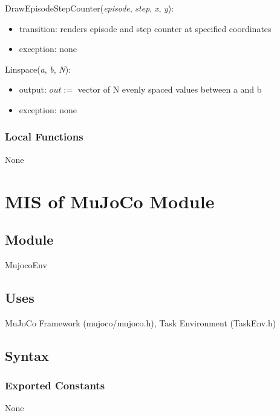 \documentclass[12pt, titlepage]{article}
\begin{document}
\noindent DrawEpisodeStepCounter(\textit{episode}, \textit{step}, \textit{x}, \textit{y}):
\begin{itemize}
\item transition: renders episode and step counter at specified coordinates
\item exception: none
\end{itemize}

\noindent Linspace(\textit{a}, \textit{b}, \textit{N}):
\begin{itemize}
\item output: $out := $ vector of N evenly spaced values between a and b
\item exception: none
\end{itemize}

\subsubsection{Local Functions}
None

\newpage

\section{MIS of MuJoCo Module} \label{MuJoCo Module}

\subsection{Module}
MujocoEnv

\subsection{Uses}
MuJoCo Framework (mujoco/mujoco.h), Task Environment (TaskEnv.h)

\subsection{Syntax}

\subsubsection{Exported Constants}
None
\end{document}
